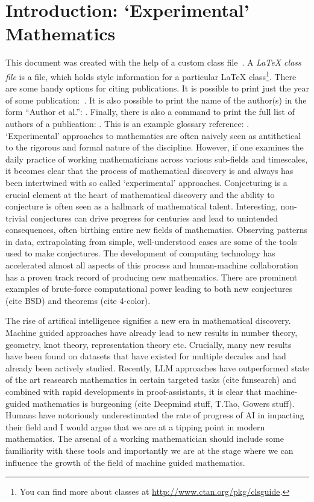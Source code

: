 \chapter{Introduction: `Experimental' Mathematics}
This document was created with the help of a custom class file~\cite{example}. A
{\em \LaTeX{} class file} is a file,
which holds style information for a particular \LaTeX{} class\footnote{You can
find more about classes at \url{http://www.ctan.org/pkg/clsguide}.}. There are some handy options for citing publications. It is possible to print just the year of some publication:~\citeyear{example}. It is also possible to print the name of the author(s) in the form ``Author et al.'': \citeauthor{example}. Finally, there is also a command to print the full list of authors of a publication: \citet*{example}.
This is an example glossary reference: .\\
 
`Experimental' approaches to mathematics are often naively seen as antithetical to the rigorous and formal nature of the discipline. However, if one examines the daily practice of working mathematicians across various sub-fields and timescales, it becomes clear that the process of mathematical discovery is and always has been intertwined with so called `experimental' approaches.
Conjecturing is a crucial element at the heart of mathematical discovery and the ability to conjecture is often seen as a hallmark of mathematical talent. Interesting, non-trivial conjectures can drive progress for centuries and lead to unintended consequences, often birthing entire new fields of mathematics. Observing patterns in data, extrapolating from simple, well-understood cases are some of the tools used to make conjectures.
The development of computing technology has accelerated almost all aspects of this process and human-machine collaboration has a proven track record of producing new mathematics. There are prominent examples of brute-force computational power leading to both new conjectures (cite {BSD}) and theorems (cite {4-color}). 
\par
The rise of artifical intelligence signifies a new era in mathematical discovery. Machine guided approaches have already lead to new results in number theory, geometry, knot theory, representation theory etc. Crucially, many new results have been found on datasets that have existed for multiple decades and had already been actively studied. Recently, LLM approaches have outperformed state of the art reasearch mathematics in certain 
targeted tasks (cite {funsearch}) and combined with rapid developments in proof-assistants, it is clear that machine-guided mathematics is burgeoning (cite {Deepmind stuff, T.Tao, Gowers stuff}).
Humans have notoriously underestimated the rate of progress of AI in impacting their field and I would argue that we are at a tipping point in modern mathematics. The arsenal of a working mathematician should include some familiarity with these tools and importantly we are at the stage where we can influence the growth of the field of machine guided mathematics.

